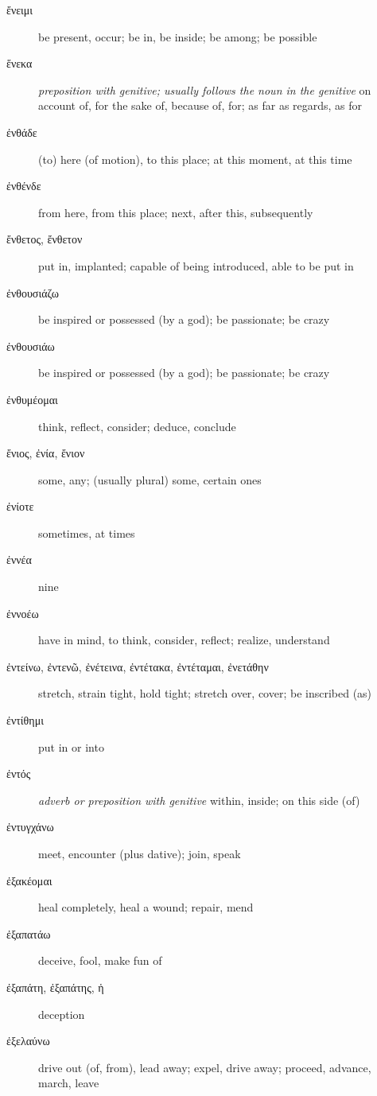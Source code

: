 \documentclass[12pt,letterpaper]{article}
\begin{document}
\begin{description}
    \item[\textgreek{ἔνειμι}] be present, occur; be in, be inside; be among; be possible
    \item[\textgreek{ἕνεκα}] \marginnote{*}\textit{preposition with genitive; usually follows the noun in the genitive} on account of, for the sake of, because of, for; as far as regards, as for
    \item[\textgreek{ἐνθάδε}] (to) here (of motion), to this place; at this moment, at this time
    \item[\textgreek{ἐνθένδε}] from here, from this place; next, after this, subsequently
    \item[\textgreek{ἔνθετος, ἔνθετον}] put in, implanted; capable of being introduced, able to be put in
    \item[\textgreek{ἐνθουσιάζω}] be inspired or possessed (by a god); be passionate; be crazy
    \item[\textgreek{ἐνθουσιάω}] be inspired or possessed (by a god); be passionate; be crazy
    \item[\textgreek{ἐνθυμέομαι}] think, reflect, consider; deduce, conclude
    \item[\textgreek{ἔνιος, ἐνία, ἔνιον}] some, any; (usually plural) some, certain ones
    \item[\textgreek{ἐνίοτε}] sometimes, at times
    \item[\textgreek{ἐννέα}] \marginnote{*}nine
    \item[\textgreek{ἐννοέω}] have in mind, to think, consider, reflect; realize, understand
    \item[\textgreek{ἐντείνω, ἐντενῶ, ἐνέτεινα, ἐντέτακα, ἐντέταμαι, ἐνετάθην}] stretch, strain tight, hold tight; stretch over, cover; be inscribed (as)
    \item[\textgreek{ἐντίθημι}] put in or into
    \item[\textgreek{ἐντός}] \textit{adverb or preposition with genitive} within, inside; on this side (of)
    \item[\textgreek{ἐντυγχάνω}] meet, encounter (plus dative); join, speak
    \item[\textgreek{ἐξακέομαι}] heal completely, heal a wound; repair, mend
    \item[\textgreek{ἐξαπατάω}] deceive, fool, make fun of
    \item[\textgreek{ἐξαπάτη, ἐξαπάτης, ἡ}] deception
    \item[\textgreek{ἐξελαύνω}] drive out (of, from), lead away; expel, drive away; proceed, advance, march, leave

\end{description}
\end{document}
